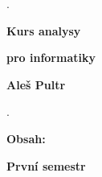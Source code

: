 \documentclass[12pt]{article}
\newcommand{\boldgreek}[1]{\mbox{\boldmath$#1$}}
\begin{document}
\def\PP{\text{\sf P}}

\def\M{\mathcal M}




\def\Ibb{\Bbb I}

\def\inff{\text{\sf Inf}}
\def\P{\mathfrak P} 
\def\bvd{\bigvee\!\!\!{}_{\text{\rm dir}}}
\def\bcd{\bigcup\!{}_{\text{\rm dir}}}

\def\US{\vartriangleleft}  \def\D{\mathcal D}     \def\J{\mathcal J}     
\def\USf{\vartriangleleft\!\!}  

\def\precf{\prec\!\!}  

\def\B{\mathfrak B} \def\AF{\mathfrak A}

\def\BF{\mathfrak B}
\def\b{\mathfrak b}

\def\UC{\mathcal U}
\def\VC{\mathcal V}
\def\AC{\mathcal A} \def\BC{\mathcal B} \def\Cc{\mathcal C}


\def\ent{\dashv}   \def\entf{\dashv\!\!}

\def\nid{\noindent}
    
\def\ol{\overline}
              \def\smin{\smallsetminus} 
\def\precs{\precsim}

\def\A{\mathcal A}

\def\ub{\text{\sf ub}}

\def\lb{\text{\sf lb}}

\def\diam{\text{\sf diam}}

\def\on{\text{\sf Ord}}

\def\can{\text{\sf Card}}
\def\gen{\text{\sf Gen}}

\def\ver#1{\text{\boldgreek#1}}

\thispagestyle{empty}

.
\vskip40mm




 \centerline{\huge\bf Kurs analysy} 
 
 \vskip7mm
 
 

 \centerline{\huge\bf pro informatiky} 
 
 \vskip20mm
 
 \centerline{\large\bf Aleš Pultr} 
 
 \newpage
 \thispagestyle{empty}

 .
 
 \newpage
 
 \renewcommand{\thepage}{\roman{page}}
 \setcounter{page}{1}
 {\Large\bf Obsah:}
 
 \vskip10mm
 
 \hskip20mm{\bf\large První semestr}
 
\end{document}

